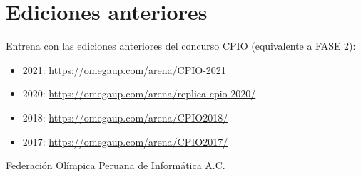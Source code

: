 \documentclass{article}
\begin{document}
\section{Ediciones anteriores}
Entrena con las ediciones anteriores del concurso CPIO (equivalente a FASE 2): 

\begin{itemize}
\item 2021: \url{https://omegaup.com/arena/CPIO-2021}
\item 2020: \url{https://omegaup.com/arena/replica-cpio-2020/}
\item 2018: \url{https://omegaup.com/arena/CPIO2018/}
\item 2017: \url{https://omegaup.com/arena/CPIO2017/}

\end{itemize}



\vspace*{1.5cm}



\hspace*{\fill}
Federación Olímpica Peruana de Informática A.C.

%
%
\end{document}

